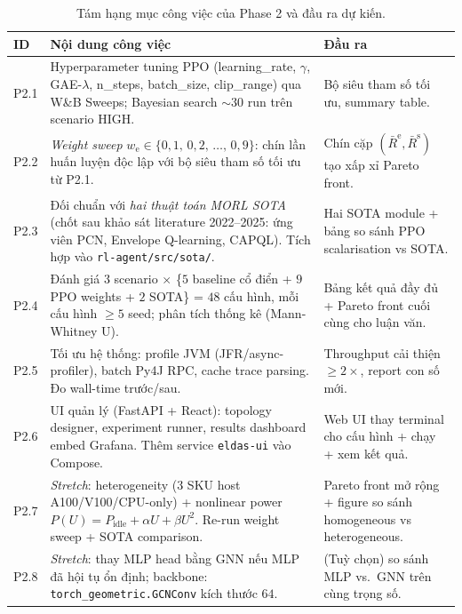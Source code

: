 \begin{table}[H]
  \centering
  \caption{Tám hạng mục công việc của Phase 2 và đầu ra dự kiến.}
  \label{tab:p2-tasks}
  \footnotesize
  \begin{tabularx}{\linewidth}{l X l}
    \toprule
    \textbf{ID} & \textbf{Nội dung công việc} & \textbf{Đầu ra} \\
    \midrule
    P2.1 & Hyperparameter tuning PPO (learning\_rate, $\gamma$,
          GAE-$\lambda$, n\_steps, batch\_size, clip\_range) qua W\&B
          Sweeps; Bayesian search $\sim 30$ run trên scenario HIGH.
        & Bộ siêu tham số tối ưu, summary table. \\
    P2.2 & \emph{Weight sweep} $w_{\mathrm{e}} \in
          \{0{,}1,\,0{,}2,\,\dots,\,0{,}9\}$: chín lần huấn luyện độc
          lập với bộ siêu tham số tối ưu từ P2.1.
        & Chín cặp $(\bar R^{\mathrm{e}},\bar R^{\mathrm{s}})$ tạo
          xấp xỉ Pareto front. \\
    P2.3 & Đối chuẩn với \emph{hai thuật toán MORL SOTA} (chốt sau
          khảo sát literature 2022--2025: ứng viên PCN, Envelope
          Q-learning, CAPQL). Tích hợp vào \texttt{rl-agent/src/sota/}.
        & Hai SOTA module + bảng so sánh PPO scalarisation vs SOTA. \\
    P2.4 & Đánh giá $3$ scenario $\times$ \{$5$ baseline cổ điển +
          $9$ PPO weights + $2$ SOTA\} = $48$ cấu hình, mỗi cấu hình
          $\ge 5$ seed; phân tích thống kê (Mann-Whitney U).
        & Bảng kết quả đầy đủ + Pareto front cuối cùng cho luận văn. \\
    P2.5 & Tối ưu hệ thống: profile JVM (JFR/async-profiler), batch
          Py4J RPC, cache trace parsing. Đo wall-time trước/sau.
        & Throughput cải thiện $\ge 2\times$, report con số mới. \\
    P2.6 & UI quản lý (FastAPI + React): topology designer, experiment
          runner, results dashboard embed Grafana. Thêm service
          \texttt{eldas-ui} vào Compose.
        & Web UI thay terminal cho cấu hình + chạy + xem kết quả. \\
    P2.7 & \emph{Stretch}: heterogeneity (3 SKU host A100/V100/CPU-only)
          + nonlinear power $P(U) = P_{\mathrm{idle}} + \alpha U +
          \beta U^2$. Re-run weight sweep + SOTA comparison.
        & Pareto front mở rộng + figure so sánh
          homogeneous vs heterogeneous. \\
    P2.8 & \emph{Stretch}: thay MLP head bằng GNN nếu MLP đã hội tụ ổn
          định; backbone: \texttt{torch\_geometric.GCNConv} kích thước
          $64$.
        & (Tuỳ chọn) so sánh MLP vs.\ GNN trên cùng trọng số. \\
    \bottomrule
  \end{tabularx}
\end{table}

